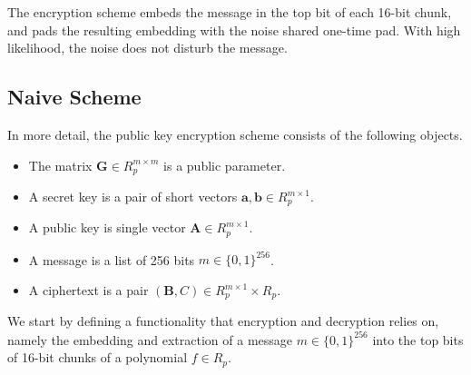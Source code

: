 The encryption scheme embeds the message in the top bit of each 16-bit chunk, and pads the resulting embedding with the noise shared one-time pad. With high likelihood, the noise does not disturb the message.

\subsection{Naive Scheme}

In more detail, the public key encryption scheme consists of the following objects.
\begin{itemize}
 \item The matrix $\mathbf{G} \in R_p^{m \times m}$ is a public parameter.
 \item A secret key is a pair of short vectors $\mathbf{a}, \mathbf{b} \in R_p^{m \times 1}$.
 \item A public key is single vector $\mathbf{A} \in R_p^{m \times 1}$.
 \item A message is a list of 256 bits $m \in \{0,1\}^{256}$.
 \item A ciphertext is a pair $(\mathbf{B}, C) \in R_p^{m \times 1} \times R_p$.
\end{itemize}

We start by defining a functionality that encryption and decryption relies on, namely the embedding and extraction of a message $m \in \{0,1\}^{256}$ into the top bits of 16-bit chunks of a polynomial $f \in R_p$.

\begin{algorithm}[!t] \label{algo:tb4-embed-msg}
\begin{scriptsize}
\caption{\emph{$\mathsf{embed\_msg}$}}
\end{scriptsize}
\end{algorithm} 
\begin{algorithm}[!t] \label{algo:tb4-extract-msg}
\begin{scriptsize}
\caption{\emph{$\mathsf{extract\_msg}$}}
\end{scriptsize}
\end{algorithm} 

